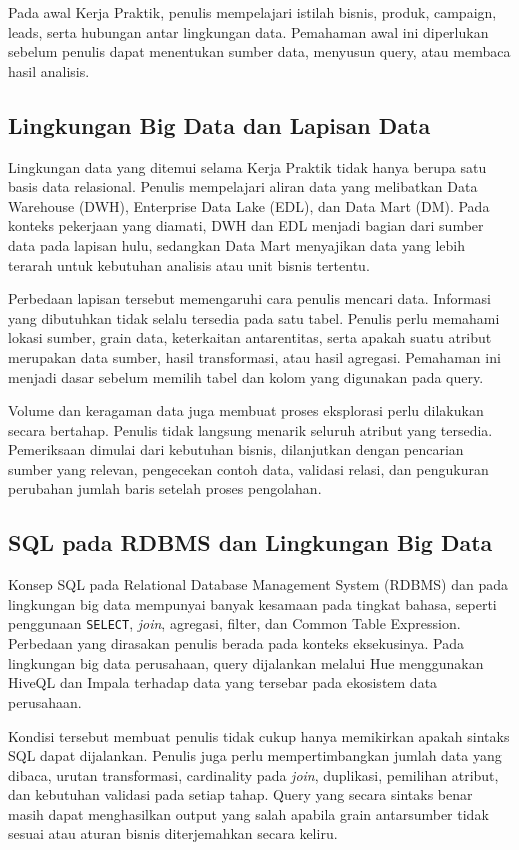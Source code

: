 Pada awal Kerja Praktik, penulis mempelajari istilah bisnis, produk, campaign, leads, serta hubungan antar lingkungan data. Pemahaman awal ini diperlukan sebelum penulis dapat menentukan sumber data, menyusun query, atau membaca hasil analisis.

\subsection{Lingkungan Big Data dan Lapisan Data}

Lingkungan data yang ditemui selama Kerja Praktik tidak hanya berupa satu basis data relasional. Penulis mempelajari aliran data yang melibatkan Data Warehouse (DWH), Enterprise Data Lake (EDL), dan Data Mart (DM). Pada konteks pekerjaan yang diamati, DWH dan EDL menjadi bagian dari sumber data pada lapisan hulu, sedangkan Data Mart menyajikan data yang lebih terarah untuk kebutuhan analisis atau unit bisnis tertentu.

Perbedaan lapisan tersebut memengaruhi cara penulis mencari data. Informasi yang dibutuhkan tidak selalu tersedia pada satu tabel. Penulis perlu memahami lokasi sumber, grain data, keterkaitan antarentitas, serta apakah suatu atribut merupakan data sumber, hasil transformasi, atau hasil agregasi. Pemahaman ini menjadi dasar sebelum memilih tabel dan kolom yang digunakan pada query.

Volume dan keragaman data juga membuat proses eksplorasi perlu dilakukan secara bertahap. Penulis tidak langsung menarik seluruh atribut yang tersedia. Pemeriksaan dimulai dari kebutuhan bisnis, dilanjutkan dengan pencarian sumber yang relevan, pengecekan contoh data, validasi relasi, dan pengukuran perubahan jumlah baris setelah proses pengolahan.

\subsection{SQL pada RDBMS dan Lingkungan Big Data}

Konsep SQL pada Relational Database Management System (RDBMS) dan pada lingkungan big data mempunyai banyak kesamaan pada tingkat bahasa, seperti penggunaan \texttt{SELECT}, \textit{join}, agregasi, filter, dan Common Table Expression. Perbedaan yang dirasakan penulis berada pada konteks eksekusinya. Pada lingkungan big data perusahaan, query dijalankan melalui Hue menggunakan HiveQL dan Impala terhadap data yang tersebar pada ekosistem data perusahaan.

Kondisi tersebut membuat penulis tidak cukup hanya memikirkan apakah sintaks SQL dapat dijalankan. Penulis juga perlu mempertimbangkan jumlah data yang dibaca, urutan transformasi, cardinality pada \textit{join}, duplikasi, pemilihan atribut, dan kebutuhan validasi pada setiap tahap. Query yang secara sintaks benar masih dapat menghasilkan output yang salah apabila grain antarsumber tidak sesuai atau aturan bisnis diterjemahkan secara keliru.

